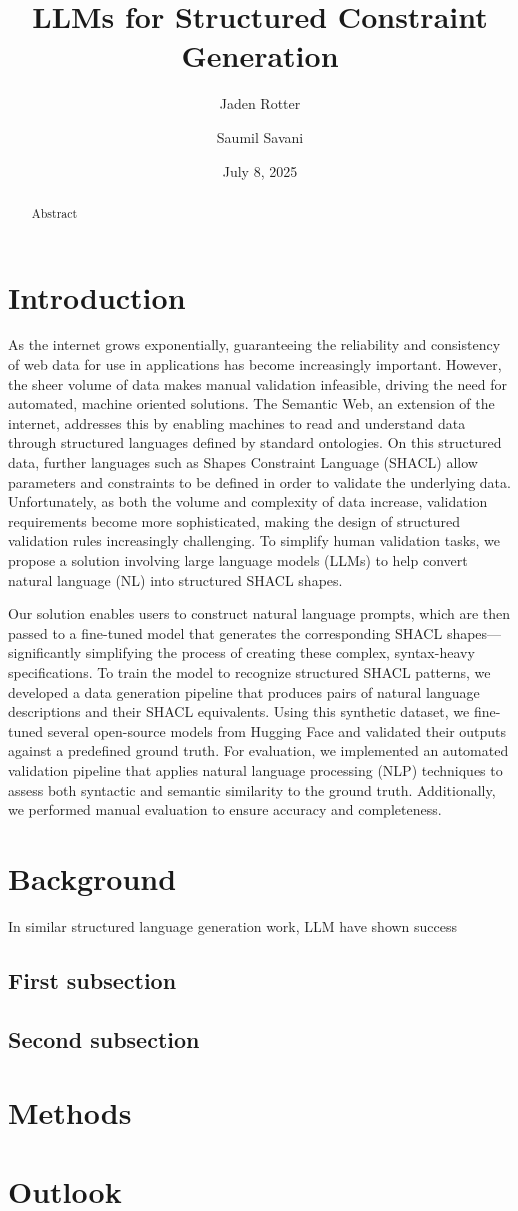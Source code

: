 \documentclass[
  english,        %
  font=times,     %
  twocolumn,      %
]{tumarticle}
\title{LLMs for Structured Constraint Generation}
\author[email=jaden.rotter@tum.de]{Jaden Rotter}
\author[email=saumil.savani@tum.de]{Saumil Savani}
\date{July 8, 2025}
\begin{document}
\maketitle

\begin{abstract}
Abstract
\end{abstract}

\section{Introduction}
As the internet grows exponentially, guaranteeing the reliability and consistency of web data for use in applications has become increasingly important. 
However, the sheer volume of data makes manual validation infeasible, driving the need for automated, machine oriented solutions. 
The Semantic Web, an extension of the internet, addresses this by enabling machines to read and understand data through structured languages defined by standard ontologies. 
On this structured data, further languages such as Shapes Constraint Language (SHACL) allow parameters and constraints to be defined in order to validate the underlying data. 
Unfortunately, as both the volume and complexity of data increase, validation requirements become more sophisticated, making the design of structured validation rules increasingly challenging.
To simplify human validation tasks, we propose a solution involving large language models (LLMs) to help convert natural language (NL) into structured SHACL shapes. 


Our solution enables users to construct natural language prompts, which are then passed to a fine-tuned model that generates the corresponding SHACL shapes—significantly simplifying the process of creating these complex, syntax-heavy specifications. 
To train the model to recognize structured SHACL patterns, we developed a data generation pipeline that produces pairs of natural language descriptions and their SHACL equivalents. 
Using this synthetic dataset, we fine-tuned several open-source models from Hugging Face and validated their outputs against a predefined ground truth.
For evaluation, we implemented an automated validation pipeline that applies natural language processing (NLP) techniques to assess both syntactic and semantic similarity to the ground truth. 
Additionally, we performed manual evaluation to ensure accuracy and completeness.


\section{Background}
In similar structured language generation work, LLM have shown success 

\subsection{First subsection}
\lipsum[2]
\subsection{Second subsection}
\lipsum[3]

\section{Methods}
\lipsum[4-5]

\section{Outlook}
\lipsum[6]
\end{document}
